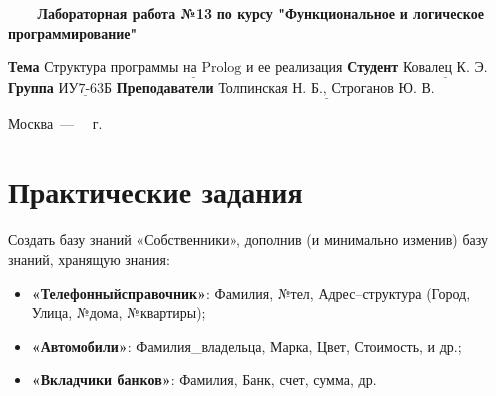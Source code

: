 \documentclass[a4paper,14pt, unknownkeysallowed]{extreport}
\begin{document}
\begin{titlepage}
	
	\begin{center}
		\noindent\begin{minipage}{1.3\textwidth}\centering
		\Large\textbf{   ~~~ Лабораторная работа №13}\newline
		\textbf{по курсу "Функциональное}\newline
		\textbf{и логическое программирование"}\newline\newline\newline
		\end{minipage}
	\end{center}
	
	\noindent\textbf{Тема} 			$\underline{\text{Структура программы на Prolog и ее реализация}}$\newline\newline
	\noindent\textbf{Студент} 		$\underline{\text{Ковалец К. Э.}}$\newline\newline
	\noindent\textbf{Группа} 		$\underline{\text{ИУ7-63Б}}$\newline\newline
	\noindent\textbf{Преподаватели} $\underline{\text{Толпинская Н. Б., Строганов Ю. В.}}$\newline
	
	\begin{center}
		\vfill
		Москва~---~\the\year
		~г.
	\end{center}
	\restoregeometry
\end{titlepage}



\setcounter{page}{2}

\chapter{Практические задания}

Создать базу знаний «Собственники», дополнив (и минимально изменив) базу знаний, хранящую знания:


\begin{itemize}
	\item \textbf{«Телефонныйсправочник»}: Фамилия, №тел, Адрес–структура (Город, Улица, №дома, №квартиры);
	\item \textbf{«Автомобили»}: Фамилия\_владельца, Марка, Цвет, Стоимость, и др.;
	\item \textbf{«Вкладчики банков»}: Фамилия, Банк, счет, сумма, др.
\end{itemize}
\end{document}
